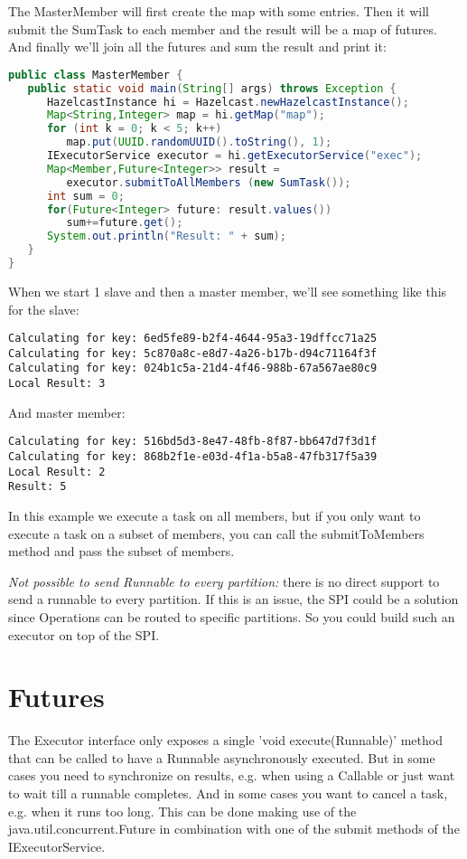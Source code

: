 The MasterMember will first create the map with some entries. Then it will submit the SumTask to each member and the result will be a map of futures. And finally we'll join all the futures and sum the result and print it:
\begin{lstlisting}[language=java]
public class MasterMember {
   public static void main(String[] args) throws Exception {
      HazelcastInstance hi = Hazelcast.newHazelcastInstance();
      Map<String,Integer> map = hi.getMap("map");
      for (int k = 0; k < 5; k++)
         map.put(UUID.randomUUID().toString(), 1);
      IExecutorService executor = hi.getExecutorService("exec");
      Map<Member,Future<Integer>> result = 
         executor.submitToAllMembers (new SumTask());
      int sum = 0;
      for(Future<Integer> future: result.values())
         sum+=future.get();
      System.out.println("Result: " + sum);
   }
}
\end{lstlisting}
When we start 1 slave and then a master member, we'll see something like this for the slave:
\begin{lstlisting}
Calculating for key: 6ed5fe89-b2f4-4644-95a3-19dffcc71a25
Calculating for key: 5c870a8c-e8d7-4a26-b17b-d94c71164f3f
Calculating for key: 024b1c5a-21d4-4f46-988b-67a567ae80c9
Local Result: 3
\end{lstlisting}
And master member:
\begin{lstlisting}
Calculating for key: 516bd5d3-8e47-48fb-8f87-bb647d7f3d1f
Calculating for key: 868b2f1e-e03d-4f1a-b5a8-47fb317f5a39
Local Result: 2
Result: 5
\end{lstlisting}
In this example we execute a task on all members, but if you only want to execute a task on a subset of members, you can call the submitToMembers method and pass the subset of members.

\emph{Not possible to send Runnable to every partition:} there is no direct support to send a runnable to every partition. If this is an issue, the SPI could be a solution since Operations can be routed to specific partitions. So you could build such an executor on top of the SPI.

\section{Futures}
The  Executor interface only exposes a single 'void execute(Runnable)' method that can be called to have a Runnable asynchronously executed. But in some cases you need to synchronize on results, e.g. when using a Callable or just want to wait till a runnable completes. And in some cases you want to cancel a task, e.g. when it runs too long. This can be done making use of the java.util.concurrent.Future in combination with one of the submit methods of the IExecutorService.

